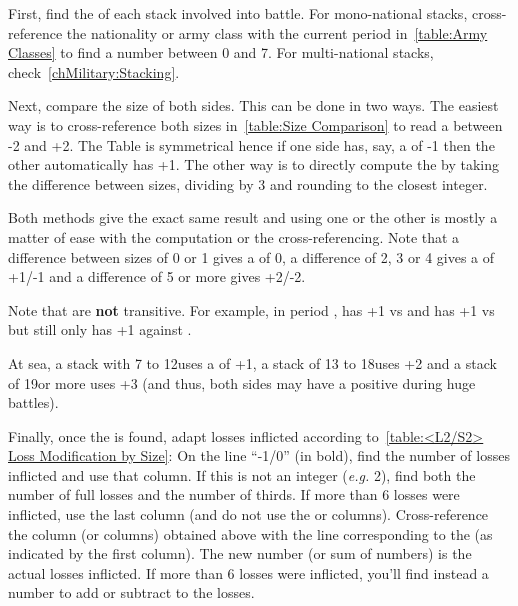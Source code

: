 First, find the  of each stack involved into battle. For
mono-national stacks, cross-reference the nationality or army class with the
current period in~\ref{table:Army Classes} to find a number between 0 and
7. For multi-national stacks, check~\ref{chMilitary:Stacking}.

Next, compare the size of both sides. This can be done in two ways. The
easiest way is to cross-reference both sizes in~\ref{table:Size Comparison} to
read a  between -2 and +2. The Table is symmetrical
hence if one side has, say, a  of -1 then the other
automatically has +1. The other way is to directly compute the  by taking the difference between sizes, dividing by 3 and
rounding to the closest integer.

Both methods give the exact same result and using one or the other is mostly a
matter of ease with the computation or the cross-referencing. Note that a
difference between sizes of 0 or 1 gives a  of 0, a
difference of 2, 3 or 4 gives a  of +1/-1 and a
difference of 5 or more gives +2/-2.

Note that  are \textbf{not} transitive. For example,
in period , \POL has +1 vs \FRA and \FRA has +1 vs \HIS but \POL
still only has +1 against \HIS.

At sea, a stack with 7 to 12\ND uses a  of +1, a
stack of 13 to 18\ND uses +2 and a stack of 19\ND or more uses +3 (and thus,
both sides may have a positive  during huge battles).


\aparag Finally, once the  is found, adapt losses
inflicted according to~\ref{table:<L2/S2> Loss Modification by Size}:
\bparag On the line ``-1/0'' (in bold), find the number of losses inflicted
and use that column. If this is not an integer (\emph{e.g.} \mbox{2\td)}, find
both the number of full losses and the number of thirds. If more than 6 losses
were inflicted, use the last column (and do not use the \texttu or \texttd
columns).
\bparag Cross-reference the column (or columns) obtained above with the line
corresponding to the  (as indicated by the first
column). The new number (or sum of numbers) is the actual losses inflicted. If
more than 6 losses were inflicted, you'll find instead a number to add or
subtract to the losses.

